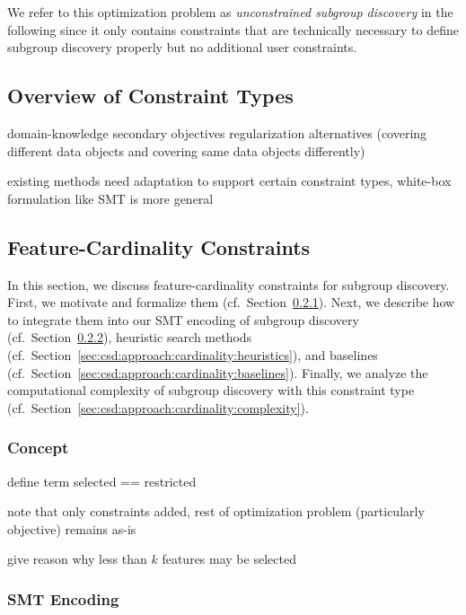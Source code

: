 \documentclass{article}
\theoremstyle{definition}
\begin{document}
We refer to this optimization problem as \emph{unconstrained subgroup discovery} in the following since it only contains constraints that are technically necessary to define subgroup discovery properly but no additional user constraints.

\subsection{Overview of Constraint Types}
\label{sec:csd:approach:constraint-types}

domain-knowledge
secondary objectives
regularization
alternatives (covering different data objects and covering same data objects differently)

existing methods need adaptation to support certain constraint types, white-box formulation like SMT is more general

\subsection{Feature-Cardinality Constraints}
\label{sec:csd:approach:cardinality}

In this section, we discuss feature-cardinality constraints for subgroup discovery.
First, we motivate and formalize them (cf.~Section~\ref{sec:csd:approach:cardinality:concept}).
Next, we describe how to integrate them into our SMT encoding of subgroup discovery (cf.~Section~\ref{sec:csd:approach:cardinality:smt}), heuristic search methods (cf.~Section~\ref{sec:csd:approach:cardinality:heuristics}), and baselines (cf.~Section~\ref{sec:csd:approach:cardinality:baselines}).
Finally, we analyze the computational complexity of subgroup discovery with this constraint type (cf.~Section~\ref{sec:csd:approach:cardinality:complexity}).

\subsubsection{Concept}
\label{sec:csd:approach:cardinality:concept}

define term selected == restricted

note that only constraints added, rest of optimization problem (particularly objective) remains as-is

give reason why less than $k$ features may be selected

\subsubsection{SMT Encoding}
\label{sec:csd:approach:cardinality:smt}
\end{document}
